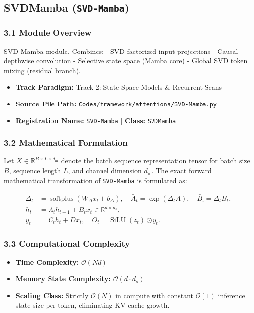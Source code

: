 \subsection{SVDMamba (\texttt{SVD-Mamba})}
\label{sec:app_module_SVD-Mamba}

\subsubsection*{3.1 Module Overview}
SVD-Mamba module.  Combines: - SVD-factorized input projections - Causal depthwise convolution - Selective state space (Mamba core) - Global SVD token mixing (residual branch).
\begin{itemize}
    \item \textbf{Track Paradigm:} Track 2: State-Space Models \& Recurrent Scans
    \item \textbf{Source File Path:} \texttt{Codes/framework/attentions/SVD-Mamba.py}
    \item \textbf{Registration Name:} \texttt{SVD-Mamba} $\mid$ \textbf{Class:} \texttt{SVDMamba}
\end{itemize}

\subsubsection*{3.2 Mathematical Formulation}
Let $X \in \mathbb{R}^{B \times L \times d_{\text{in}}}$ denote the batch sequence representation tensor for batch size $B$, sequence length $L$, and channel dimension $d_{\text{in}}$. The exact forward mathematical transformation of \texttt{SVD-Mamba} is formulated as:

\begin{align}
\Delta_t &= \operatorname{softplus}(W_\Delta x_t + b_\Delta), \quad \bar{A}_t = \exp(\Delta_t A), \quad \bar{B}_t = \Delta_t B_t, \\
h_t &= \bar{A}_t h_{t-1} + \bar{B}_t x_t \in \mathbb{R}^{d \times d_s}, \\
y_t &= C_t h_t + D x_t, \quad O_t = \operatorname{SiLU}(z_t) \odot y_t.
\end{align}


\subsubsection*{3.3 Computational Complexity}
\begin{itemize}
    \item \textbf{Time Complexity:} $\mathcal{O}(N d)$
    \item \textbf{Memory State Complexity:} $\mathcal{O}(d \cdot d_s)$
    \item \textbf{Scaling Class:} Strictly $\mathcal{O}(N)$ in compute with constant $\mathcal{O}(1)$ inference state size per token, eliminating KV cache growth.
\end{itemize}

